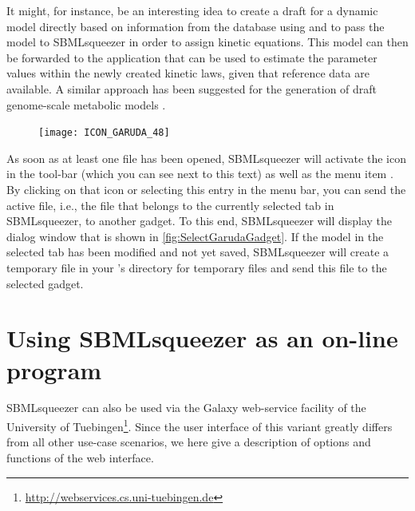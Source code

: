 It might, for instance, be an interesting idea to create a draft for a dynamic model directly based on information from the \KEGG database using \KEGGtranslator \citep{Wrzodek2011, Wrzodek2013} and to pass the model to SBMLsqueezer in order to assign kinetic equations. This model can then be forwarded to the application \SBMLsimulator \citep{Keller2013, Keller2014} that can be used to estimate the parameter values within the newly created kinetic laws, given that reference data are available.
A similar approach has been suggested for the generation of draft genome-scale metabolic models \citep{Buechel2013}.

\begin{figure}
\vspace{\wrapfigspace}
\texttt{[image: ICON\_GARUDA\_48]}
\end{figure}
As soon as at least one \SBML file has been opened, SBMLsqueezer will activate the \Garuda icon in the tool-bar (which you can see next to this text) as well as the menu item .
By clicking on that icon or selecting this entry in the menu bar, you can send the active file, i.e., the file that belongs to the currently selected tab in SBMLsqueezer, to another gadget.
To this end, SBMLsqueezer will display the dialog window that is shown in \vref{fig:SelectGarudaGadget}.
If the model in the selected tab has been modified and not yet saved, SBMLsqueezer will create a temporary file in your \OS's directory for temporary files and send this file to the selected gadget.

\section{Using SBMLsqueezer as an on-line program}
\label{sec:SBMLsqueezer_online_version}

SBMLsqueezer can also be used via the Galaxy web-service facility \citep{Goecks2010} of the University of Tuebingen\footnote{\url{http://webservices.cs.uni-tuebingen.de}\label{fn:Webservices}}.
Since the user interface of this variant greatly differs from all other use-case scenarios, we here give a description of options and functions of the web interface.

